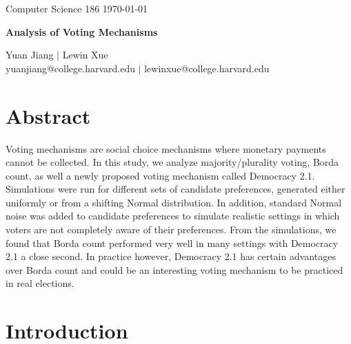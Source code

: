 \documentclass[11pt]{scrartcl}
\begin{document}
\noindent Computer Science 186 \hfill \today\\
\noindent\makebox[\linewidth]{\rule{6.5in}{2.0pt}}

\begin{center}

{{\LARGE \bf Analysis of Voting Mechanisms}}

\noindent\makebox[\linewidth]{\rule{6.5in}{2.0pt}}

\vspace{3mm}

{\large Yuan Jiang $|$ Lewin Xue} \\
\normalsize yuanjiang@college.harvard.edu $|$ lewinxue@college.harvard.edu \\

\end{center}


\vspace{2mm}

\section{Abstract}
Voting mechanisms are social choice mechanisms where monetary payments cannot be collected. In this study, we analyze majority/plurality voting, Borda count, as well a newly proposed voting mechanism called Democracy 2.1. Simulations were run for different sets of candidate preferences, generated either uniformly or from a shifting Normal distribution. In addition, standard Normal noise was added to candidate preferences to simulate realistic settings in which voters are not completely aware of their preferences. From the simulations, we found that Borda count performed very well in many settings with Democracy 2.1 a close second. In practice however, Democracy 2.1 has certain advantages over Borda count and could be an interesting voting mechanism to be practiced in real elections. 

\section{Introduction}
\end{document}
